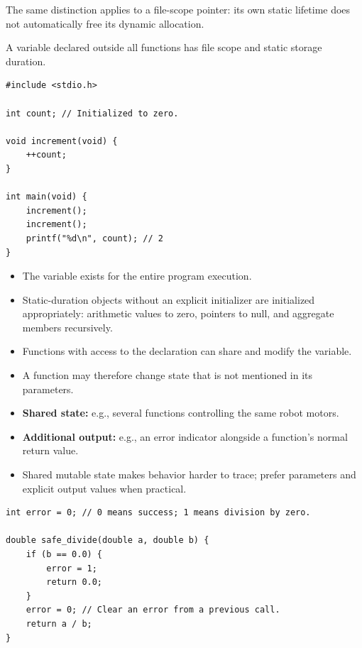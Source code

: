 \documentclass[11pt,a4paper]{article}
\providecommand{\tightlist}{\setlength{\itemsep}{0pt}\setlength{\parskip}{0pt}}
\begin{document}
The same distinction applies to a file-scope pointer: its own static lifetime does not automatically free its dynamic allocation.

\label{file-scope-variables-shared-state}
\hypertarget{file-scope-variables-shared-state}{}

A variable declared outside all functions has file scope and static storage duration.

\begin{lstlisting}[style=cscode]
#include <stdio.h>

int count; // Initialized to zero.

void increment(void) {
    ++count;
}

int main(void) {
    increment();
    increment();
    printf("%d\n", count); // 2
}
\end{lstlisting}

\begin{itemize}
\tightlist
\item
  The variable exists for the entire program execution.
\item
  Static-duration objects without an explicit initializer are initialized appropriately: arithmetic values to zero, pointers to null, and aggregate members recursively.
\item
  Functions with access to the declaration can share and modify the variable.
\item
  A function may therefore change state that is not mentioned in its parameters.
\end{itemize}

\label{uses-and-tradeoffs}
\hypertarget{uses-and-tradeoffs}{}

\begin{itemize}
\tightlist
\item
  \textbf{Shared state:} e.g., several functions controlling the same robot motors.
\item
  \textbf{Additional output:} e.g., an error indicator alongside a function's normal return value.
\item
  Shared mutable state makes behavior harder to trace; prefer parameters and explicit output values when practical.
\end{itemize}

\begin{lstlisting}[style=cscode]
int error = 0; // 0 means success; 1 means division by zero.

double safe_divide(double a, double b) {
    if (b == 0.0) {
        error = 1;
        return 0.0;
    }
    error = 0; // Clear an error from a previous call.
    return a / b;
}
\end{lstlisting}
\end{document}
